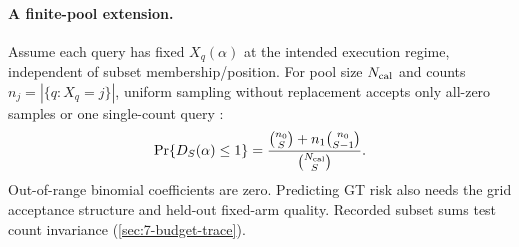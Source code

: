 \paragraph{A finite-pool extension.}
Assume each query has fixed $X_q(\alpha)$ at the intended execution regime, independent of subset membership/position. For pool size $N_{\rm cal}$ and counts $n_j=|\{q:X_q=j\}|$, uniform sampling without replacement accepts only all-zero samples or one single-count query \cite{nist_hypergeometric}:
\begin{equation}
 \Pr\{D_S(\alpha)\leq1\}
 =\frac{\binom{n_0}{S}+n_1\binom{n_0}{S-1}}{\binom{N_{\rm cal}}{S}}.
 \label{eq:6-finite-pool}
\end{equation}
Out-of-range binomial coefficients are zero. Predicting GT risk also needs the grid acceptance structure and held-out fixed-arm quality. Recorded subset sums test count invariance (\cref{sec:7-budget-trace}).